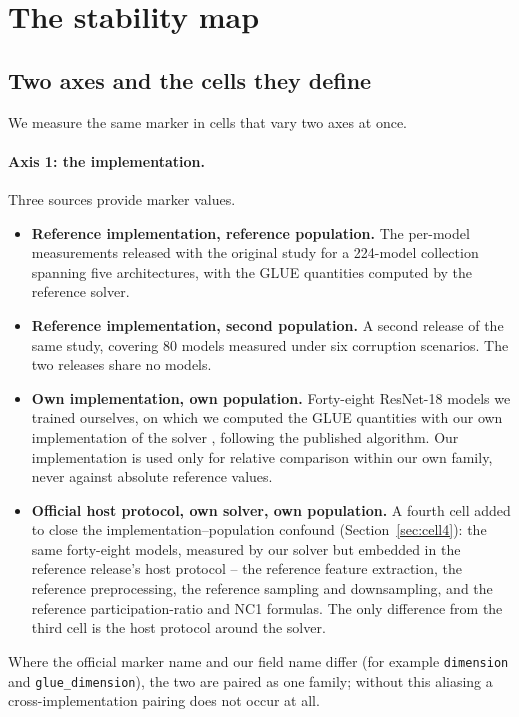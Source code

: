 \documentclass[10pt]{article}
\begin{document}
\section{The stability map}

\label{sec:map}

\subsection{Two axes and the cells they define}

We measure the same marker in cells that vary two axes at once.

\paragraph{Axis 1: the implementation.} Three sources provide marker values.
\begin{itemize}
\item \textbf{Reference implementation, reference population.} The per-model
      measurements released with the original study for a 224-model collection
      spanning five architectures, with the GLUE quantities computed by the
      reference solver.
\item \textbf{Reference implementation, second population.} A second release of
      the same study, covering 80 models measured under six corruption
      scenarios. The two releases share no models.
\item \textbf{Own implementation, own population.} Forty-eight ResNet-18 models
      we trained ourselves, on which we computed the GLUE quantities with our
      own implementation of the solver \citep{chung2018classification},
      following the published algorithm. Our implementation is used only for
      relative comparison within our own family, never against absolute
      reference values.
\item \textbf{Official host protocol, own solver, own population.} A fourth
      cell added to close the implementation--population confound
      (Section~\ref{sec:cell4}): the same forty-eight models, measured by our
      solver but embedded in the reference release's host protocol -- the
      reference feature extraction, the reference preprocessing, the reference
      sampling and downsampling, and the reference participation-ratio and
      NC1 formulas. The only difference from the third cell is the host
      protocol around the solver.
\end{itemize}
Where the official marker name and our field name differ (for example
\texttt{dimension} and \texttt{glue\_dimension}), the two are paired as one
family; without this aliasing a cross-implementation pairing does not occur at
all.
\end{document}
